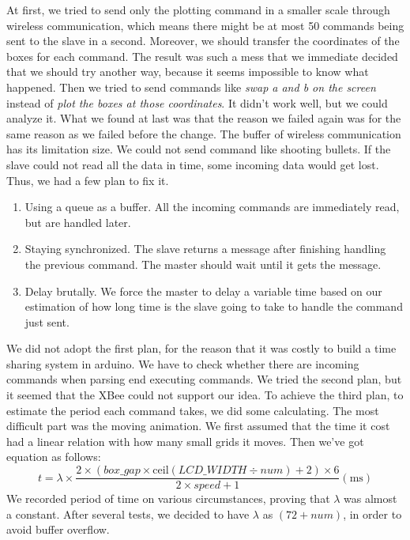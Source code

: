At first, we tried to send only the plotting command in a smaller scale through wireless communication, which means there might be at most 50 commands being sent to the slave in a second. Moreover, we should transfer the coordinates of the boxes for each command. The result was such a mess that we immediate decided that we should try another way, because it seems impossible to know what happened. Then we tried to send commands like \textit{swap a and b on the screen} instead of \textit{plot the boxes at those coordinates}. It didn't work well, but we could analyze it. What we found at last was that the reason we failed again was for the same reason as we failed before the change. The buffer of wireless communication has its limitation size. We could not send command like shooting bullets. If the slave could not read all the data in time, some incoming data would get lost. Thus, we had a few plan to fix it.
\begin{enumerate}
	\item Using a queue as a buffer. All the incoming commands are immediately read, but are handled later.
	\item Staying synchronized. The slave returns a message after finishing handling the previous command. The master should wait until it gets the message.
	\item Delay brutally. We force the master to delay a variable time based on our estimation of how long time is the slave going to take to handle the command just sent.
\end{enumerate}
\hfill \newline
We did not adopt the first plan, for the reason that it was costly to build a time sharing system in arduino. We have to check whether there are incoming commands when parsing end executing commands. We tried the second plan, but it seemed that the XBee could not support our idea. To achieve the third plan, to estimate the period each command takes, we did some calculating. The most difficult part was the moving animation. We first assumed that the time it cost had a linear relation with how many small grids it moves. Then we've got equation as follows:
\begin{equation}
	t = \lambda \times \frac{2 \times (box\_gap \times \mathrm{ceil}(LCD\_WIDTH \div num) + 2) \times 6}{2 \times speed + 1} (\mathrm{ms})
\end{equation}
\hfill \newline
We recorded period of time on various circumstances, proving that $\lambda$ was almost a constant. After several tests, we decided to have $\lambda$ as $(72+num)$, in order to avoid buffer overflow.
